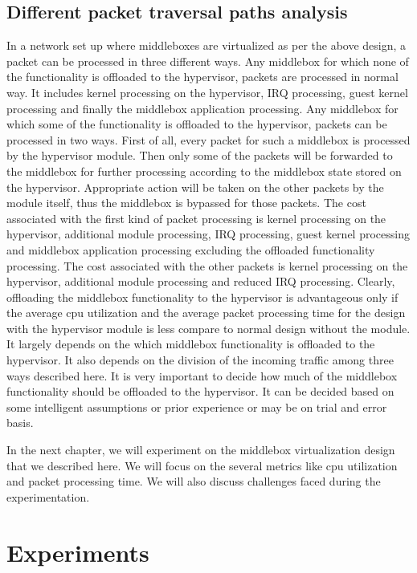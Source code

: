 \documentclass[a4paper,11pt]{report}
\begin{document}
\section{Different packet traversal paths analysis}
In a network set up where middleboxes are virtualized as per the above design, a packet can be processed in three different ways. Any middlebox for which none of the functionality is offloaded to the hypervisor, packets are processed in normal way. It includes kernel processing on the hypervisor, IRQ processing, guest kernel processing and finally the middlebox application processing. Any middlebox for which some of the functionality is offloaded to the hypervisor, packets can be processed in two ways. First of all, every packet for such a middlebox is processed by the hypervisor module. Then only some of the packets will be forwarded to the middlebox for further processing according to the middlebox state stored on the hypervisor. Appropriate action will be taken on the other packets by the module itself, thus the middlebox is bypassed for those packets. The cost associated with the first kind of packet processing is kernel processing on the hypervisor, additional module processing, IRQ processing, guest kernel processing and middlebox application processing excluding the offloaded functionality processing. The cost associated with the other packets is kernel processing on the hypervisor, additional module processing and reduced IRQ processing. Clearly, offloading the middlebox functionality to the hypervisor is advantageous only if the average cpu utilization and the average packet processing time for the design with the hypervisor module is less compare to normal design without the module. It largely depends on the which middlebox functionality is offloaded to the hypervisor. It also depends on the division of the incoming traffic among three ways described here. It is very important to decide how much of the middlebox functionality should be offloaded to the hypervisor. It can be decided based on some intelligent assumptions or prior experience or may be on trial and error basis.

\bigskip
In the next chapter, we will experiment on the middlebox virtualization design that we described here. We will focus on the several metrics like cpu utilization and packet processing time. We will also discuss challenges faced during the experimentation.   



\chapter{Experiments}
\end{document}
